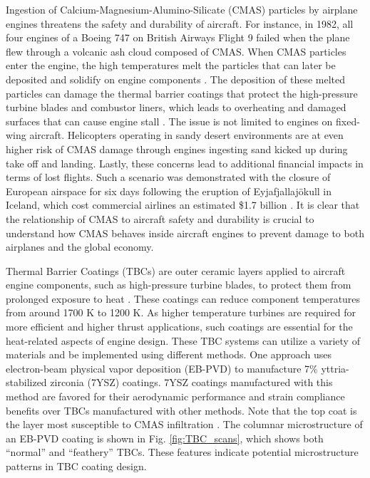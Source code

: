 \documentclass[%
 aip,
 amsmath,amssymb,
 reprint,%
]{revtex4-1}
\begin{document}
Ingestion of Calcium-Magnesium-Alumino-Silicate (CMAS) particles by airplane engines threatens the safety and durability of aircraft. For instance, in 1982, all four engines of a Boeing 747 on British Airways Flight 9 failed when the plane flew through a volcanic ash cloud composed of CMAS. When CMAS particles enter the engine, the high temperatures melt the particles that can later be deposited and solidify on engine components \cite{Chen2015}. The deposition of these melted particles can damage the thermal barrier coatings that protect the high-pressure turbine blades and combustor liners, which leads to overheating and damaged surfaces that can cause engine stall \cite{Chen2015}. The issue is not limited to engines on fixed-wing aircraft. Helicopters operating in sandy desert environments are at even higher risk of CMAS damage through engines ingesting sand kicked up during take off and landing\cite{Smialek}. Lastly, these concerns lead to additional financial impacts in terms of lost flights. Such a scenario was demonstrated with the closure of European airspace for six days following the eruption of Eyjafjallajökull in Iceland, which cost commercial airlines an estimated \$1.7 billion \cite{Thehumanconditionblog_2010}. It is clear that the relationship of CMAS to aircraft safety and durability is crucial to understand how CMAS behaves inside aircraft engines to prevent damage to both airplanes and the global economy.

Thermal Barrier Coatings (TBCs) are outer ceramic layers applied to aircraft engine components, such as high-pressure turbine blades, to protect them from prolonged exposure to heat \cite{Bennett2005}. These coatings can reduce component temperatures \cite{Sirigiri2018} from around 1700 K to 1200 K. As higher temperature turbines are required for more efficient and higher thrust applications, such coatings are essential for the heat-related aspects of engine design. 
These TBC systems can utilize a variety of materials and be implemented using different methods. One approach uses electron-beam physical vapor deposition (EB-PVD) to manufacture 7\% yttria-stabilized zirconia (7YSZ) coatings. 7YSZ coatings manufactured with this method are favored for their aerodynamic performance and strain compliance benefits over TBCs manufactured with other methods. Note that the top coat is the layer most susceptible to CMAS infiltration \cite{Renteria2007}. 
The columnar microstructure of an EB-PVD coating is shown in Fig. \ref{fig:TBC_scans}, which shows both ``normal'' and ``feathery'' TBCs. These features indicate potential microstructure patterns in TBC coating design. 
\end{document}
